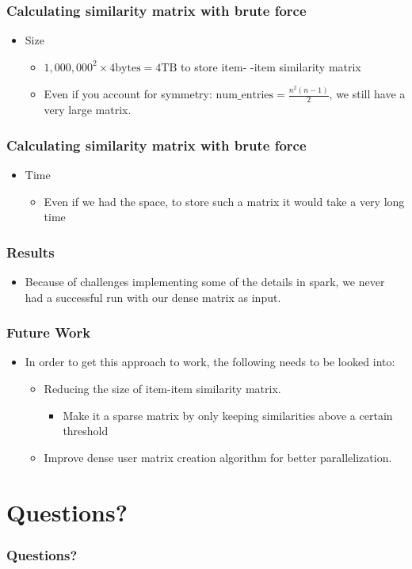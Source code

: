 \documentclass[11pt]{beamer}
\begin{document}
  \begin{frame}
    \frametitle{Calculating similarity matrix with brute force}
    \begin{itemize}
      \item Size
        \begin{itemize}
          \item $1,000,000^2 \times 4\text{bytes} = 4\text{TB}$ to store item-
          -item similarity matrix
          \item Even if you account for symmetry: $\text{num\_entries} = \frac{n^2(n-1)}{2}$, 
          we still have a very large matrix.
        \end{itemize}
    \end{itemize}
  \end{frame}

  \begin{frame}
    \frametitle{Calculating similarity matrix with brute force}
    \begin{itemize}
      \item Time 
        \begin{itemize}
          \item Even if we had the space, to store such a matrix it would take a very long time
        \end{itemize}
    \end{itemize}
  \end{frame}

  \begin{frame}
    \frametitle{Results}
    \begin{itemize}
      \item Because of challenges implementing some of the details in spark, we never had a successful run
      with our dense matrix as input.
    \end{itemize}
  \end{frame}

  \begin{frame}
    \frametitle{Future Work}
    \begin{itemize}
      \item In order to get this approach to work, the following needs to be looked into: 
      \begin{itemize}
        \item Reducing the size of item-item similarity matrix.
        \begin{itemize}
          \item Make it a sparse matrix by only keeping similarities above a certain threshold
        \end{itemize}
        \item Improve dense user matrix creation algorithm for better parallelization. 
      \end{itemize}
    \end{itemize}
  \end{frame}

  \section{Questions?}
  \begin{frame}
    \frametitle{Questions?}
  \end{frame}

  
\end{document}
